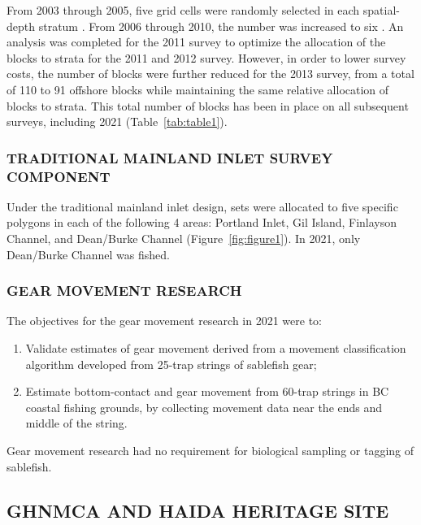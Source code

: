 \documentclass[12pt]{article}\usepackage[]{graphicx}\usepackage[]{color}
\begin{document}
From 2003 through 2005, five grid cells were randomly selected in each spatial-depth stratum . From 2006 through 2010, the number was increased to six . An analysis was completed for the 2011 survey to optimize the allocation of the blocks to strata for the 2011 and 2012 survey. However, in order to lower survey costs, the number of blocks were further reduced for the 2013 survey, from a total of 110 to 91 offshore blocks while maintaining the same relative allocation of blocks to strata. This total number of blocks has been in place on all subsequent surveys, including 2021 (Table~\ref{tab:table1}).

\hypertarget{traditional-mainland-inlet-survey-component}{%
\subsubsection{TRADITIONAL MAINLAND INLET SURVEY COMPONENT}\label{traditional-mainland-inlet-survey-component}}

Under the traditional mainland inlet design, sets were allocated to five specific polygons in each of the following 4 areas: Portland Inlet, Gil Island, Finlayson Channel, and Dean/Burke Channel (Figure~\ref{fig:figure1}). In 2021, only Dean/Burke Channel was fished.

\hypertarget{gear-movement-research}{%
\subsubsection{GEAR MOVEMENT RESEARCH}\label{gear-movement-research}}

The objectives for the gear movement research in 2021 were to:
\begin{enumerate}
\def\labelenumi{\arabic{enumi}.}

\item
  Validate estimates of gear movement derived from a movement classification algorithm developed from 25-trap strings of sablefish gear;
\item
  Estimate bottom-contact and gear movement from 60-trap strings in BC coastal fishing grounds, by collecting movement data near the ends and middle of the string.
\end{enumerate}
Gear movement research had no requirement for biological sampling or tagging of sablefish.

\hypertarget{ghnmca-and-haida-heritage-site}{%
\subsection{GHNMCA AND HAIDA HERITAGE SITE}\label{ghnmca-and-haida-heritage-site}}
\end{document}

